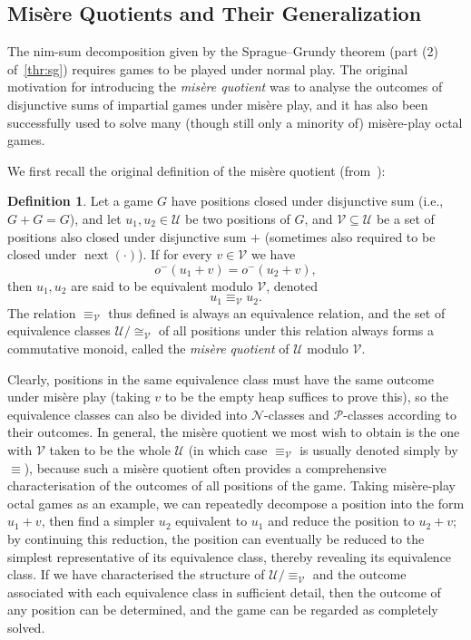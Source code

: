 \documentclass[11pt]{article}
\theoremstyle{definition}
\newtheorem{definition}{Definition}[section]
\theoremstyle{plain}
\newcommand{\varP}{\mathcal{P}}
\newcommand{\varN}{\mathcal{N}}
\newcommand{\varU}{\mathcal{U}}
\newcommand{\varV}{\mathcal{V}}
\newcommand{\nxt}{\operatorname{next}}
\begin{document}
\subsection{Misère Quotients and Their Generalization}

The nim-sum decomposition given by the Sprague--Grundy theorem (part (2) of~\ref{thr:sg}) requires games to be played under normal play.
The original motivation for introducing the \textit{misère quotient} was to analyse the outcomes of disjunctive sums of impartial games under misère play,
and it has also been successfully used to solve many (though still only a minority of) misère-play octal games.

We first recall the original definition of the misère quotient (from~\cite{MisQuot2006}):

\begin{definition}
    Let a game $G$ have positions closed under disjunctive sum (i.e., $G+G=G$),
    and let $u_1, u_2 \in \varU$ be two positions of $G$, and $\varV\subseteq \varU$ be a set of positions also closed under disjunctive sum $+$ (sometimes also required to be closed under $\nxt(\cdot)$).
    If for every $v\in \varV$ we have
    \[
        o^-(u_1 + v) = o^-(u_2 + v),
    \]
    then $u_1, u_2$ are said to be equivalent modulo $\varV$, denoted
    \[
        u_1 \equiv_{\varV} u_2.
    \]
    The relation $\equiv_{\varV}$ thus defined is always an equivalence relation,
    and the set of equivalence classes $\varU / \cong_{\varV}$ of all positions under this relation always forms a commutative monoid, called the \textit{misère quotient} of $\varU$ modulo $\varV$.
\end{definition}

Clearly, positions in the same equivalence class must have the same outcome under misère play (taking $v$ to be the empty heap suffices to prove this), so the equivalence classes can also be divided into $\varN$-classes and $\varP$-classes according to their outcomes.
In general, the misère quotient we most wish to obtain is the one with $\varV$ taken to be the whole $\varU$ (in which case $\equiv_{\varV}$ is usually denoted simply by $\equiv$),
because such a misère quotient often provides a comprehensive characterisation of the outcomes of all positions of the game.
Taking misère-play octal games as an example, we can repeatedly decompose a position into the form $u_1 + v$, then find a simpler $u_2$ equivalent to $u_1$ and reduce the position to $u_2 + v$;
by continuing this reduction, the position can eventually be reduced to the simplest representative of its equivalence class, thereby revealing its equivalence class.
If we have characterised the structure of $\varU / \equiv_{\varV}$ and the outcome associated with each equivalence class in sufficient detail, then the outcome of any position can be determined, and the game can be regarded as completely solved.
\end{document}
